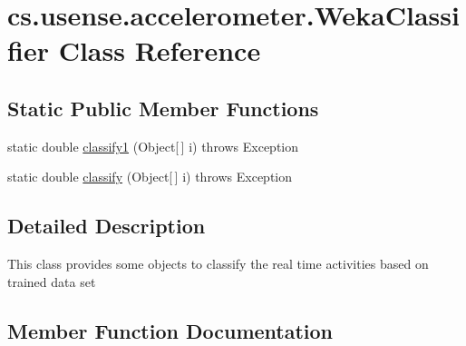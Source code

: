 \hypertarget{classcs_1_1usense_1_1accelerometer_1_1_weka_classifier}{}\section{cs.\+usense.\+accelerometer.\+Weka\+Classifier Class Reference}
\label{classcs_1_1usense_1_1accelerometer_1_1_weka_classifier}
\subsection*{Static Public Member Functions}
\begin{DoxyCompactItemize}
\item 
static double \hyperlink{classcs_1_1usense_1_1accelerometer_1_1_weka_classifier_aca7f069e5282243a15311d6e63b53d1f}{classify1} (Object\mbox{[}$\,$\mbox{]} i)  throws Exception 
\item 
static double \hyperlink{classcs_1_1usense_1_1accelerometer_1_1_weka_classifier_a87e064c45705ba6eaf34920e89751917}{classify} (Object\mbox{[}$\,$\mbox{]} i)  throws Exception 
\end{DoxyCompactItemize}


\subsection{Detailed Description}
This class provides some objects to classify the real time activities based on trained data set 

\subsection{Member Function Documentation}
\hypertarget{classcs_1_1usense_1_1accelerometer_1_1_weka_classifier_a87e064c45705ba6eaf34920e89751917}{}
